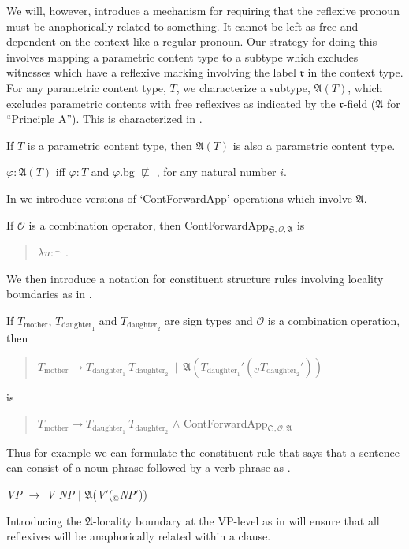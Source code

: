 We will, however, introduce a mechanism for requiring that the
reflexive pronoun must be anaphorically related to something.  It
cannot be left as free and dependent on the context like a regular
pronoun.  Our strategy for doing this involves mapping a parametric
content type to a subtype which excludes witnesses which have a
reflexive marking involving the label $\mathfrak{r}$ in the context
type.  For any parametric content type, $T$, we characterize a
subtype, $\mathfrak{A}(T)$, which excludes parametric contents with
free reflexives as indicated by the $\mathfrak{r}$-field
($\mathfrak{A}$ for ``Principle A'').  This is characterized in \nexteg{}.
\begin{ex} 
If $T$ is a parametric content type, then $\mathfrak{A}(T)$ is also a
parametric content type.

$\varphi:\mathfrak{A}(T)$ iff $\varphi:T$ and $\varphi$.bg
$\not\sqsubseteq$ , for any natural number $i$.
\end{ex} 
In \nexteg{} we introduce versions of `ContForwardApp' operations
which involve $\mathfrak{A}$.
\begin{ex} 
  If $\mathcal{O}$ is a combination operator, then
  ContForwardApp$_{\mathfrak{S},\mathcal{O},\mathfrak{A}}$ is
  \begin{quote}
    $\lambda u$:$^\frown$ . 
  \end{quote}
  \end{ex} 
We then introduce a notation for constituent structure rules involving
locality boundaries as in \nexteg{}.
\begin{ex} 
If $T_{\text{mother}}$, $T_{\text{daughter}_1}$ and
  $T_{\text{daughter}_2}$ are sign types and $\mathcal{O}$ is a
  combination operation, then
  \begin{quote}
    $T_{\text{mother}}\longrightarrow
    T_{\text{daughter}_1}\ T_{\text{daughter}_2}\ \mid\
    \mathfrak{A}(T_{\text{daughter}_1}'(_{\mathcal{O}}T_{\text{daughter}_2}'))$
  \end{quote}
  is
  \begin{quote}
  $T_{\text{mother}}\longrightarrow
    T_{\text{daughter}_1}\ T_{\text{daughter}_2}$ \d{\d{$\wedge$}}
    ContForwardApp$_{\mathfrak{S},\mathcal{O},\mathfrak{A}}$
  \end{quote}
  
\end{ex} 
Thus for example we can formulate the constituent rule that says
that a sentence can consist of a noun phrase followed by a verb phrase
as \nexteg{}.
\begin{ex} 
  \textit{VP} $\longrightarrow$ \textit{V NP} $\mid$ $\mathfrak{A}$(\textit{V}$'$($_{\text{@}}$\textit{NP}$'$))
\end{ex} 
Introducing the $\mathfrak{A}$-locality boundary at the VP-level as in
\preveg{} will ensure that all reflexives will be anaphorically
related within a clause.

